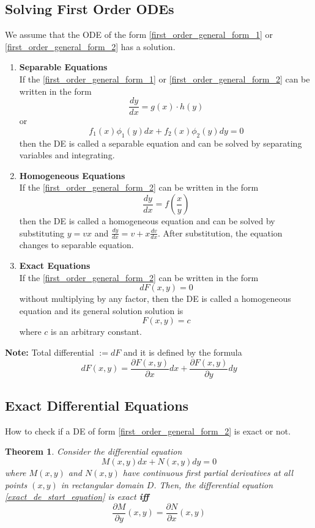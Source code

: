 \documentclass[oneside]{book}
\newtheorem{theorem}{Theorem}[chapter]
\begin{document}
\subsection{Solving First Order ODEs}
We assume that the ODE of the form \cref{first_order_general_form_1} or \cref{first_order_general_form_2} has a solution.
\begin{enumerate}
	\item \textbf{Separable Equations}\\
	      If the \cref{first_order_general_form_1} or \cref{first_order_general_form_2} can be written in the form
	      \[
		      \frac{dy}{dx} = g(x)\cdot h(y)
	      \]
	      or
	      \[
		      f_1(x)\phi_1(y)dx + f_2(x)\phi_2(y)dy = 0
	      \]
	      then the DE is called a separable equation and can be solved by separating variables and integrating.
	\item \textbf{Homogeneous Equations}\\
	      If the \cref{first_order_general_form_2} can be written in the form
	      \[
		      \frac{dy}{dx} = f(\frac{x}{y})
	      \]
	      then the DE is called a homogeneous equation and can be solved by substituting \(y = vx\) and \(\displaystyle \frac{dy}{dx} = v + x\frac{dv}{dx}\). After substitution, the equation changes to separable equation.
	\item \textbf{Exact Equations}\\
	      If the \cref{first_order_general_form_2} can be written in the form
	      \[
		      dF(x, y) = 0
	      \]
	      without multiplying by any factor,
	      then the DE is called a homogeneous equation and its general solution solution is
	      \[
		      F(x, y) = c
	      \]
	      where $c$ is an arbitrary constant.
\end{enumerate}
\textbf{Note:} Total differential $:= dF$ and it is defined by the formula
\[
	dF(x, y) = \frac{\partial F(x, y)}{\partial x}dx + \frac{\partial F(x, y)}{\partial y}dy
\]
\subsection{Exact Differential Equations}
How to check if a DE of form \cref{first_order_general_form_2} is exact or not.
\begin{theorem}
	Consider the differential equation
	\begin{equation}
		M(x, y)dx + N(x, y)dy = 0
		\label{exact_de_start_equation}
	\end{equation}
	where $M(x, y)$ and $N(x, y)$ have continuous first partial derivatives at all points $(x, y)$ in rectangular domain $D$. Then, the differential equation \ref{exact_de_start_equation} is exact \textbf{iff}
	\[
		\frac{\partial M}{\partial y}(x, y) = \frac{\partial N}{\partial x}(x, y)
	\]
\end{theorem}
\end{document}
